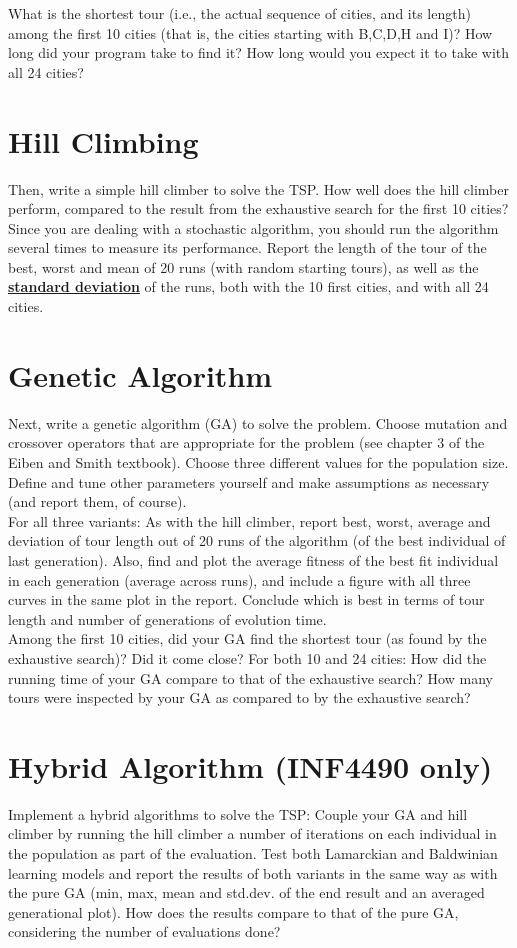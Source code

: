 What is the shortest tour (i.e., the actual sequence of cities, and its
length) among the first 10 cities (that is, the cities starting with B,C,D,H
and I)? How long did your program take to find it? How long would you expect
it to take with all 24 cities?

\section*{Hill Climbing}
Then, write a simple hill climber to solve the TSP. How well does the hill
climber perform, compared to the result from the exhaustive search for the
first 10 cities? Since you are dealing with a stochastic algorithm, you should
run the algorithm several times to measure its performance. Report the length
of the tour of the best, worst and mean of 20 runs (with random starting
tours), as well as the
\href{https://en.wikipedia.org/wiki/Standard_deviation}{\textbf{standard deviation}}
of the runs, both with the 10 first cities, and with all 24 cities.

\section*{Genetic Algorithm}
Next, write a genetic algorithm (GA) to solve the problem. Choose mutation
and crossover operators that are appropriate for the problem (see chapter 3
of the Eiben and Smith textbook). Choose three different values for the
population size. Define and tune other parameters yourself and make
assumptions as necessary (and report them, of course).\\

For all three variants: As with the hill climber, report best, worst, average
and deviation of tour length out of 20 runs of the algorithm (of the best
individual of last generation). Also, find and plot the average fitness of
the best fit individual in each generation (average across runs), and include
a figure with all three curves in the same plot in the report. Conclude which
is best in terms of tour length and number of generations of evolution time.\\

Among the first 10 cities, did your GA find the shortest tour (as found by the
exhaustive search)? Did it come close? For both 10 and 24 cities: How did the
running time of your GA compare to that of the exhaustive search? How many
tours were inspected by your GA as compared to by the exhaustive search?

\section*{Hybrid Algorithm (INF4490 only)}
Implement a hybrid algorithms to solve the TSP: Couple your GA and hill
climber by running the hill climber a number of iterations on each individual
in the population as part of the evaluation. Test both Lamarckian and
Baldwinian learning models and report the results of both variants in the same
way as with the pure GA (min, max, mean and std.dev. of the end result and an
averaged generational plot). How does the results compare to that of the pure
GA, considering the number of evaluations done?



